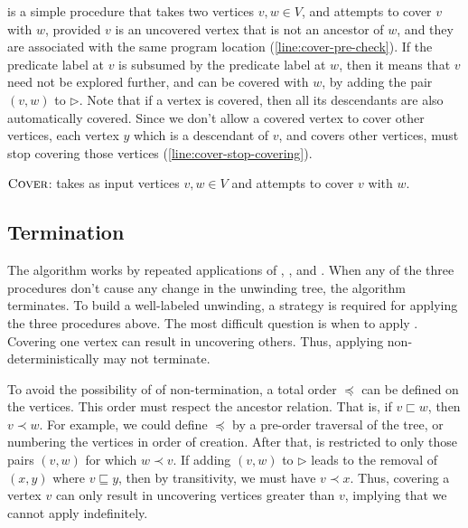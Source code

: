 \cover is a simple procedure that takes two vertices $v, w \in V$, and attempts to cover
$v$ with $w$, provided $v$ is an uncovered vertex that is not an ancestor of $w$, and they
are associated with the same program location (\autoref{line:cover-pre-check}). If the
predicate label at $v$ is subsumed by the predicate label at $w$, then it means that
$v$ need not be explored further, and can be covered with $w$, by adding the pair $(v,w)$
to $\rhd$. Note that if a vertex is covered, then all its descendants are also
automatically covered. Since we don't allow a covered vertex to cover other vertices, each
vertex $y$ which is a descendant of $v$, and covers other vertices, must stop covering
those vertices (\autoref{line:cover-stop-covering}).

\begin{algorithm}[ht]


  \caption{$\textsc{Cover}$: takes as input vertices $v, w \in V$ and attempts to cover $v$ with $w$.}
  \label{alg:cover}
\end{algorithm}

\subsection{Termination}
The \impact algorithm works by repeated applications of \expand, \cover, and . When
any of the three procedures don't cause any change in the unwinding tree, the algorithm
terminates. To build a well-labeled unwinding, a strategy is required for applying the
three procedures above. The most difficult question is when to apply \cover. Covering one
vertex can result in uncovering others. Thus, applying \cover non-deterministically may
not terminate.

To avoid the possibility of of non-termination, a total order $\preceq$ can be defined on
the vertices. This order must respect the ancestor relation. That is, if $v \sqsubset w$,
then $v \prec w$. For example, we could define $\preceq$ by a pre-order traversal of the
tree, or numbering the vertices in order of creation. After that, \cover is restricted to
only those pairs $(v,w)$ for which $w \prec v$. If adding $(v,w)$ to $\rhd$ leads to the
removal of $(x,y)$ where $v \sqsubseteq y$, then by transitivity, we must have
$v \prec x$. Thus, covering a vertex $v$ can only result in uncovering vertices greater
than $v$, implying that we cannot apply \cover indefinitely.

